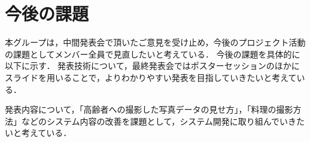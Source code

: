 \documentclass[../report]{subfiles}
\begin{document}
\section{今後の課題}
本グループは，中間発表会で頂いたご意見を受け止め，今後のプロジェクト活動の課題としてメンバー全員で見直したいと考えている．
今後の課題を具体的に以下に示す．
発表技術について，最終発表会ではポスターセッションのほかにスライドを用いることで，よりわかりやすい発表を目指していきたいと考えている．

発表内容について，「高齢者への撮影した写真データの見せ方」，「料理の撮影方法」などのシステム内容の改善を課題として，システム開発に取り組んでいきたいと考えている．
\end{document}
